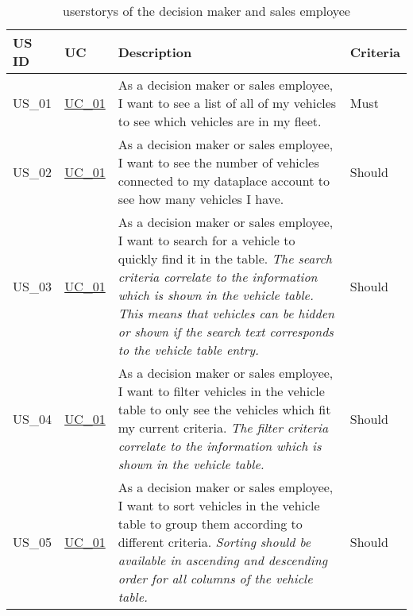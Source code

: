   \sffamily
  \begin{footnotesize}
    \begin{longtable}[L L L L]{ p{} p{} p{} p{}}
      \caption                       %
          {\Glspl{userstory} of the decision maker and sales employee} %
          \\
      \toprule
      \textbf{US ID} & \textbf{UC} & \textbf{Description} & \textbf{Criteria} \\
      \midrule

      \hypertarget{Ref:US1}{US\_01} & \hyperlink{Ref:UC1}{UC\_01} & As a decision maker or sales employee, I want to see a list of all of my vehicles to see which vehicles are in my fleet. & Must \\ 
      
      \rowcolor{Gray}
      \hypertarget{Ref:US2}{US\_02} & \hyperlink{Ref:UC1}{UC\_01} & As a decision maker or sales employee, I want to see the number of vehicles connected to my \gls{dataplace} account to see how many vehicles I have. & Should \\

      \hypertarget{Ref:US3}{US\_03} & \hyperlink{Ref:UC1}{UC\_01} & As a decision maker or sales employee, I want to search for a vehicle to quickly find it in the table.
      \newline
      \emph{The search criteria correlate to the information which is shown in the vehicle table. This means that vehicles can be hidden or shown if the search text corresponds to the vehicle table entry.} & Should
      \\
      
      \rowcolor{Gray}
      \hypertarget{Ref:US4}{US\_04} & \hyperlink{Ref:UC1}{UC\_01} & As a decision maker or sales employee, I want to filter vehicles in the vehicle table to only see the vehicles which fit my current criteria.
      \newline
      \emph{The filter criteria correlate to the information which is shown in the vehicle table.} & Should
      \\

      \hypertarget{Ref:US5}{US\_05} & \hyperlink{Ref:UC1}{UC\_01} & As a decision maker or sales employee, I want to sort vehicles in the vehicle table to group them according to different criteria. 
      \newline
      \emph{Sorting should be available in ascending and descending order for all columns of the vehicle table.} & Should
      \\


\end{longtable}
\end{footnotesize}
